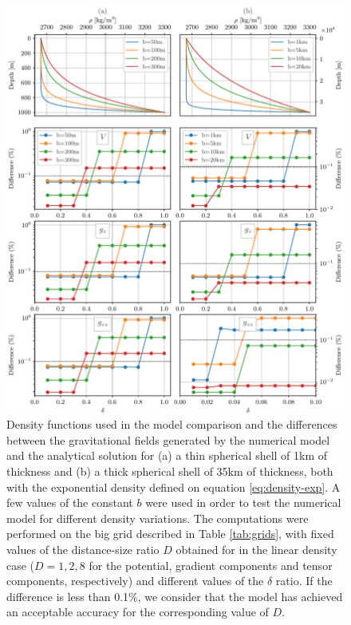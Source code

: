 \documentclass[extra]{gji}
\begin{document}
\begin{figure}
\centering
\includegraphics[width=\linewidth]{figures/exponential-delta.pdf}
\caption{
    Density functions used in the model comparison and the differences 
    between the gravitational fields generated by the numerical model 
    and the analytical solution for (a) a thin spherical shell of 1km 
    of thickness and (b) a thick spherical shell of 35km of thickness, 
    both with the exponential density defined on equation 
    \ref{eq:density-exp}.
    A few values of the constant $b$ were used in order to test the 
    numerical model for different density variations.
    The computations were performed on the big grid described in 
    Table \ref{tab:grids}, with fixed values of the distance-size ratio 
    $D$ obtained for in the linear density case ($D=1, 2, 8$ for the 
    potential, gradient components and tensor components, respectively)
    and different values of the $\delta$ ratio.
    If the difference is less than 0.1\%, we consider that the model 
    has achieved an acceptable accuracy for the corresponding value of 
    $D$.
    }
\label{fig:delta-exponential}
\end{figure}
\end{document}
